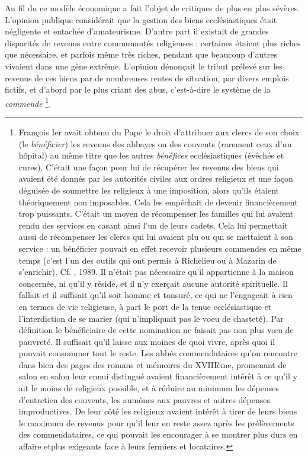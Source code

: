  Au fil du  ce modèle économique a fait l'objet de critiques de plus en plus sévères. L'opinion publique considérait que la gestion des biens ecclésiastiques était négligente et entachée d'amateurisme. D'autre part il existait de grandes disparités de revenus entre communautés religieuses : certaines étaient plus riches que nécessaire, et parfois même très riches, pendant que beaucoup d'autres vivaient dans une gêne extrême. L'opinion dénonçait le tribut prélevé sur les revenus de ces biens par de nombreuses rentes de situation, par divers emplois fictifs, et d'abord par le plus criant des abus, c'est-à-dire le système de la \emph{commende}
\footnote{François Ier avait obtenu du Pape le droit d'attribuer aux clercs de son choix (le \emph{bénéficier}) les revenus des abbayes ou des couvents (rarement ceux d'un hôpital) au même titre que les autres \emph{bénéfices} ecclésiastiques (évêchés et cures). C'était une façon pour lui de récupérer les revenus des biens qui avaient été donnés par les autorités civiles aux ordres religieux et une façon déguisée de soumettre les religieux à une imposition, alors qu'ils étaient théoriquement non imposables. Cela les empêchait de devenir financièrement trop puissants. C'était un moyen de récompenser les familles qui lui avaient rendu des services en casant ainsi l'un de leurs cadets. Cela lui permettait aussi de récompenser les clercs qui lui avaient plu ou qui se mettaient à son service : un bénéficier pouvait en effet recevoir plusieurs commendes en même temps (c'est l'un des outils qui ont permis à Richelieu ou à Mazarin de s'enrichir). Cf. , 1989. Il n'était pas nécessaire qu'il appartienne à la maison concernée, ni qu'il y réside, et il n'y exerçait aucune autorité spirituelle. Il fallait et il suffisait qu'il soit homme et tonsuré, ce qui ne l'engageait à rien en termes de vie religieuse, à part le port de la tenue ecclésiastique et l'interdiction de se marier (qui n'impliquait pas le voeu de chasteté). Par définition le bénéficiaire de cette nomination ne faisait pas non plus vœu de pauvreté. Il suffisait qu'il laisse aux moines de quoi vivre, après quoi il pouvait consommer tout le reste. Les abbés commendataires qu'on rencontre dans bien des pages des romans et mémoires du XVIIIème, promenant de salon en salon leur ennui distingué avaient financièrement intérêt à ce qu'il y ait le moins de religieux possible, et à réduire au minimum les dépenses d'entretien des couvents, les aumônes aux pauvres et autres dépenses improductives. De leur côté les religieux avaient intérêt à tirer de leurs biens le maximum de revenus pour qu'il leur en reste assez après les prélèvements des commendataires, ce qui pouvait les encourager à se montrer plus durs en affaire etplus exigeants face à leurs fermiers et locataires.}. 

